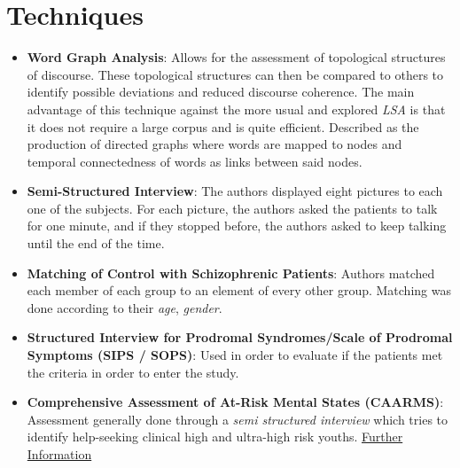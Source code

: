 \documentclass{Paper_Summary}
\begin{document}
\section{Techniques}
    \begin{itemize}
        \item \textbf{Word Graph Analysis}: Allows for the assessment of topological structures of discourse. These topological structures can then be compared to others to identify possible deviations and reduced discourse coherence. The main advantage of this technique against the more usual and explored \emph{LSA} is that it does not require a large corpus and is quite efficient. Described as the production of directed graphs where words are mapped to nodes and temporal connectedness of words as links between said nodes.
        \item \textbf{Semi-Structured Interview}: The authors displayed eight pictures to each one of the subjects. For each picture, the authors asked the patients to talk for one minute, and if they stopped before, the authors asked to keep talking until the end of the time.
        \item \textbf{Matching of Control with Schizophrenic Patients}: Authors matched each member of each group to an element of every other group. Matching was done according to their \emph{age}, \emph{gender}.
        \item \textbf{Structured Interview for Prodromal Syndromes/Scale of Prodromal Symptoms (SIPS / SOPS)}: Used in order to evaluate if the patients met the criteria in order to enter the study.
        \item \textbf{Comprehensive Assessment of At-Risk Mental States (CAARMS)}: Assessment generally done through a \emph{semi structured interview} which tries to identify help-seeking clinical high and ultra-high risk youths. \href{https://www.orygen.org.au/Training/Resources/Psychosis/Manuals/CAARMS}{Further Information}
        
    \end{itemize}
\end{document}
